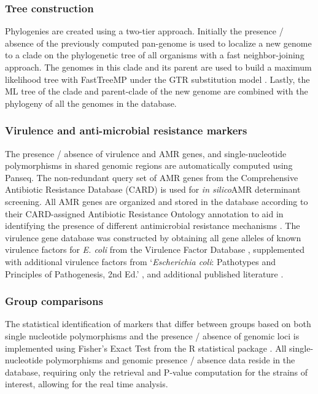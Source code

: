 \documentclass{bmcart}
\begin{document}
\subsubsection{Tree construction}
Phylogenies are created using a two-tier approach. Initially the presence / absence of the previously computed pan-genome is used to localize a new genome to a clade on the phylogenetic tree of all organisms with a fast neighbor-joining approach. The genomes in this clade and its parent are used to build a maximum likelihood tree with FastTreeMP under the GTR substitution model \cite{price_fasttree_2010}. Lastly, the ML tree of the clade and parent-clade of the new genome are combined with the phylogeny of all the genomes in the database.

\subsubsection{Virulence and anti-microbial resistance markers}
The presence / absence of virulence and AMR genes, and single-nucleotide polymorphisms in shared genomic regions are automatically computed using Panseq. The non-redundant query set of AMR genes from the Comprehensive Antibiotic Resistance Database (CARD) \cite{mcarthur_comprehensive_2013} is used for \textit{in silico}AMR determinant screening. All AMR genes are organized and stored in the database according to their CARD-assigned Antibiotic Resistance Ontology annotation to aid in identifying the presence of different antimicrobial resistance mechanisms . The virulence gene database was constructed by obtaining all gene alleles of known virulence factors for \textit{E. coli} from the Virulence Factor Database \cite{chen_vfdb_2011}, supplemented with additional virulence factors from `\textit{Escherichia coli}: Pathotypes and Principles of Pathogenesis, 2nd Ed.' , and additional published literature \cite{donnenberg_escherichia_2013}. 

\subsubsection{Group comparisons}
The statistical identification of markers that differ between groups based on both single nucleotide polymorphisms and the presence / absence of genomic loci is implemented using Fisher’s Exact Test from the R statistical package \cite{r_foundation_for_statistical_computing_r:_2005}. All single-nucleotide polymorphisms and genomic presence / absence data reside in the database, requiring only the retrieval and P-value computation for the strains of interest, allowing for the real time analysis.
\end{document}
